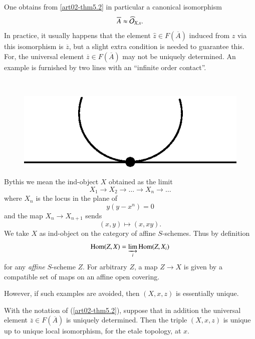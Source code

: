 One obtains from \ref{art02-thm5.2} in particular a canonical isomorphism 
$$
\overline{A}\approx \widehat{\mathcal{O}}_{X,x}.
$$
In practice, it usually happens that the element $\widehat{z}\in F(\overline{A})$ induced from $z$ via this isomorphism is $\overline{z}$, but a slight extra condition is needed to guarantee this. For, the universal element $\overline{z}\in F(\overline{A})$ may not be uniquely determined. An example is furnished by two lines with an ``infinite order contact''.

\begin{example}\label{art02-exam5.3}
~

\begin{figure}[H]
\centering
\includegraphics{figure/fig1.eps}
\end{figure}
By\pageoriginale this we mean the ind-object $X$ obtained as the limit
$$
X_{1}\to X_{2}\to\ldots\to X_{n}\to\ldots
$$
where $X_{n}$ is the locus in the plane of
$$
y(y-x^{n})=0
$$
and the map $X_{n}\to X_{n+1}$ sends
$$
(x,y)\mapsto (x,xy).
$$
We take $X$ as ind-object on the category of affine $S$-schemes. Thus by definition
\setcounter{equation}{3}
\begin{equation}
\operatorname{\mathrm{Hom}} (Z,X)=\varinjlim\limits_{i}\operatorname{\mathrm{Hom}} (Z,X_{i})\label{art02-eq5.4}
\end{equation}
for any {\em affine} $S$-scheme $Z$. For arbitrary $Z$, a map $Z\to X$ is given by a compatible set of maps on an affine open covering.
\end{example}

However, if such examples are avoided, then $(X,x,z)$ is essentially unique.

\setcounter{theorem}{4}
\begin{theorem}[Uniqueness]\label{art02-thm5.5}
With the notation of (\ref{art02-thm5.2}), suppose that in addition the universal element $\overline{z}\in F(\overline{A})$ is uniquely determined. Then the triple $(X,x,z)$ is unique up to unique local isomorphism, for the etale topology, at $x$.
\end{theorem}

